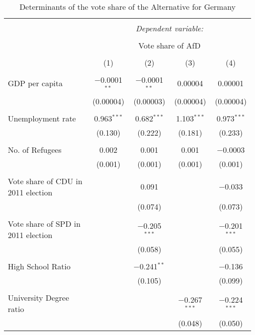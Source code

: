 
\begin{table}[!htbp] \centering 
  \caption{Determinants of the vote share of the Alternative for Germany} 
  \label{AfD_voteshare} 
\small 
\begin{tabular}{@{\extracolsep{5pt}}lcccc} 
\\[-1.8ex]\hline 
\hline \\[-1.8ex] 
 & \multicolumn{4}{c}{\textit{Dependent variable:}} \\ 
\cline{2-5} 
\\[-1.8ex] & \multicolumn{4}{c}{Vote share of AfD} \\ 
\\[-1.8ex] & (1) & (2) & (3) & (4)\\ 
\hline \\[-1.8ex] 
 GDP per capita & $-$0.0001$^{**}$ & $-$0.0001$^{**}$ & 0.00004 & 0.00001 \\ 
  & (0.00004) & (0.00003) & (0.00004) & (0.00004) \\ 
  & & & & \\ 
 Unemployment rate & 0.963$^{***}$ & 0.682$^{***}$ & 1.103$^{***}$ & 0.973$^{***}$ \\ 
  & (0.130) & (0.222) & (0.181) & (0.233) \\ 
  & & & & \\ 
 No. of Refugees & 0.002 & 0.001 & 0.001 & $-$0.0003 \\ 
  & (0.001) & (0.001) & (0.001) & (0.001) \\ 
  & & & & \\ 
 Vote share of CDU in 2011 election &  & 0.091 &  & $-$0.033 \\ 
  &  & (0.074) &  & (0.073) \\ 
  & & & & \\ 
 Vote share of SPD in 2011 election &  & $-$0.205$^{***}$ &  & $-$0.201$^{***}$ \\ 
  &  & (0.058) &  & (0.055) \\ 
  & & & & \\ 
 High School Ratio &  & $-$0.241$^{**}$ &  & $-$0.136 \\ 
  &  & (0.105) &  & (0.099) \\ 
  & & & & \\ 
 University Degree ratio &  &  & $-$0.267$^{***}$ & $-$0.224$^{***}$ \\ 
  &  &  & (0.048) & (0.050) \\ 

\end{tabular}
\end{table}
